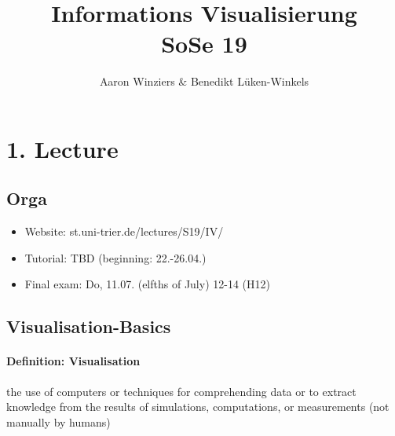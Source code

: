 \documentclass[10pt,a4paper]{article}
\author{Aaron Winziers \& Benedikt Lüken-Winkels}
\title{Informations Visualisierung \\ SoSe 19}
\begin{document}
	
	\maketitle
	\tableofcontents
	\newpage
	
	\section{1. Lecture}
	\subsection{Orga}
	\begin{itemize}
		\item Website: st.uni-trier.de/lectures/S19/IV/
		\item Tutorial: TBD (beginning: 22.-26.04.)
		\item Final exam: Do, 11.07. (elfths of July) 12-14 (H12)
	\end{itemize}
	
	\subsection{Visualisation-Basics}
	\paragraph*{Definition: Visualisation} 
	the use of computers or techniques for comprehending data or to extract knowledge from the results of simulations, computations, or measurements (not manually by humans)
\end{document}
